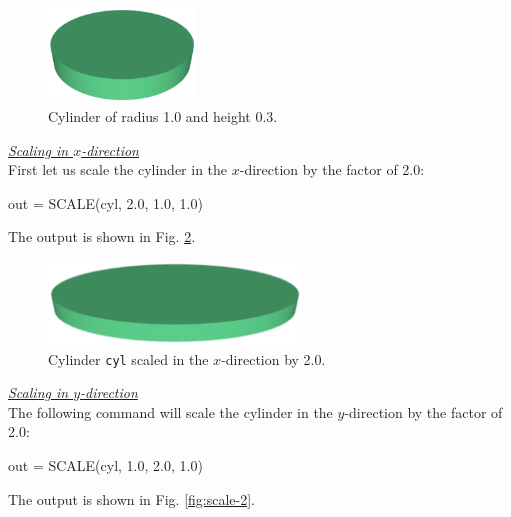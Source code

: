 \begin{figure}[!ht]
\begin{center}
\includegraphics[width=0.35\textwidth]{img/scale-0.png}
\end{center}
\vspace{-4mm}
\caption{Cylinder of radius 1.0 and height 0.3.}
\label{fig:scale-0}
\end{figure}

\noindent
\underline{\em Scaling in $x$-direction}\\

First let us scale the cylinder in the $x$-direction by the factor of 2.0: 

\begin{bluecode}
out = SCALE(cyl, 2.0, 1.0, 1.0)
\end{bluecode}
\newpage
\noindent
The output is shown in Fig. \ref{fig:scale-1}.

\begin{figure}[!ht]
\begin{center}
\includegraphics[width=0.6\textwidth]{img/scale-1.png}
\end{center}
\vspace{-4mm}
\caption{Cylinder {\tt cyl} scaled in the $x$-direction by 2.0.}
\label{fig:scale-1}
\end{figure}

\noindent
\underline{\em Scaling in $y$-direction}\\

The following command will 
scale the cylinder in the $y$-direction by the factor of 2.0: 

\begin{bluecode}
out = SCALE(cyl, 1.0, 2.0, 1.0)
\end{bluecode}
The output is shown in Fig. \ref{fig:scale-2}.


